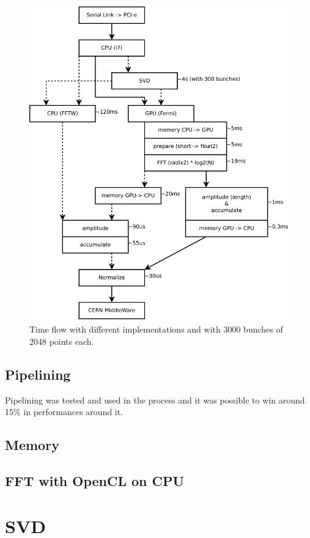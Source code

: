 \begin{figure}
\caption{Time flow with different implementations and with 3000 bunches of 
2048 points each.}
\centering
\includegraphics[scale=0.4]{PC-flow.pdf}
\end{figure}

   \subsection{Pipelining}

   Pipelining was tested and used in the process and it was possible to
   win around 15\% in performances around it.

   \subsection{Memory}

   \subsection{FFT with OpenCL on CPU}



\section{SVD}


